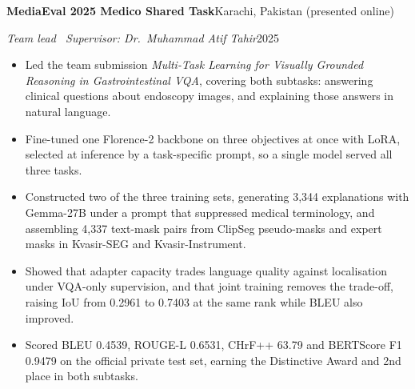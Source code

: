 \documentclass[11pt,letterpaper]{article}
\newenvironment{entrybox}
  {\par\vspace{0.5em}\noindent\begin{minipage}{\linewidth}}
  {\end{minipage}\par}
\newcommand{\orgline}[2]{\textbf{#1}\hfill #2\par}
\newcommand{\roleline}[2]{\textit{#1}\hfill #2\par\vspace{0.15em}}
\begin{document}
\begin{entrybox}
  \orgline{MediaEval 2025 Medico Shared Task}{Karachi, Pakistan (presented online)}
  \roleline{Team lead \textbar\ Supervisor: Dr.\ Muhammad Atif Tahir}{2025}
  \begin{itemize}
    \item Led the team submission \textit{Multi-Task Learning for Visually Grounded Reasoning in
          Gastrointestinal VQA}, covering both subtasks: answering clinical questions about
          endoscopy images, and explaining those answers in natural language.
    \item Fine-tuned one Florence-2 backbone on three objectives at once with LoRA, selected at
          inference by a task-specific prompt, so a single model served all three tasks.
    \item Constructed two of the three training sets, generating 3,344 explanations with Gemma-27B
          under a prompt that suppressed medical terminology, and assembling 4,337 text-mask pairs
          from ClipSeg pseudo-masks and expert masks in Kvasir-SEG and Kvasir-Instrument.
    \item Showed that adapter capacity trades language quality against localisation under
          VQA-only supervision, and that joint training removes the trade-off, raising IoU from
          0.2961 to 0.7403 at the same rank while BLEU also improved.
    \item Scored BLEU 0.4539, ROUGE-L 0.6531, CHrF++ 63.79 and BERTScore F1 0.9479 on the official
          private test set, earning the Distinctive Award and 2nd place in both subtasks.
  \end{itemize}
\end{entrybox}
\end{document}
